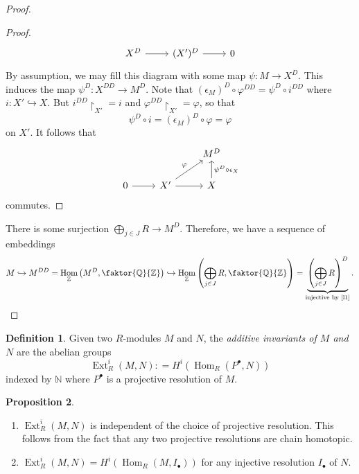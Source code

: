 \documentclass[10pt,letterpaper,cm]{nupset}
\theoremstyle{definition}
\newtheorem{definition}{Definition}[subsection]
\theoremstyle{theorem}
\newtheorem{prop}[definition]{Proposition}
\theoremstyle{remark}
\newcommand{\N}{\mathbb N}
\newcommand{\Q}{\mathbb Q}
\newcommand{\Z}{\mathbb Z}
\newcommand{\1}{\mathbf{1}}
\newcommand{\0}{\vec 0}
\DeclareMathOperator{\ext}{Ext}
\DeclareMathOperator{\Hom}{Hom}
\begin{document}
\begin{proof}
\begin{proof}
\[\begin{tikzcd}
X^D \arrow[r] & (X')^D \arrow[r] & 0
\end{tikzcd}
\]
By assumption, we may fill this diagram with some map $\psi : M \to X^D$. This induces the map $\psi^D : X^{DD} \to M^D$. Note that $(\epsilon_M)^D \circ \varphi^{DD} = \psi^D \circ i^{DD}$ where $i : X' \hookrightarrow X$. But $i^{DD}\restriction_{X'} =i$ and $\varphi^{DD}\restriction_{X'} = \varphi$, so that $$\psi^D \circ i = (\epsilon_M)^D \circ  \varphi = \varphi$$ on $X'$. It follows that
\[
\begin{tikzcd}
 &  & M^D \\
0 \arrow[r] & X' \arrow[r] \arrow[ru, "\varphi"] & X \arrow[u, "\psi^D \circ \epsilon_X"']
\end{tikzcd}
\] commutes.
\end{proof}
There is some surjection $\bigoplus_{j\in J} R \to M^D$. Therefore, we have a sequence of embeddings $$M \hookrightarrow M^{DD} =\Hom_{\Z}\left(M^D, \faktor{\Q}{\Z} \right) \hookrightarrow \Hom_{\Z}\left(\bigoplus_{j\in J} R, \faktor{\Q}{\Z}\right) = \underbrace{\left(\bigoplus_{j\in J} R \right)^D}_{\text{injective by \cref{l1}}}.$$
\end{proof}

\begin{definition}
Given two $R$-modules $M$ and $N$, the \textit{additive invariants of $M$ and $N$} are the abelian groups $$\ext^i_R (M, N): = H^i(\Hom_R(P^{\bullet}, N))$$ indexed by $\N$  where $P^{\bullet}$ is a projective resolution of $M$. 
\end{definition}

\begin{prop}\label{prop2} $ $
\begin{enumerate}
\item $\ext^i_R(M, N)$ is independent of the choice of projective resolution. This follows from the fact that any two projective resolutions are chain homotopic.
\item $\ext^i_R(M, N) = H^i(\Hom_R(M, I_{\bullet}))$ for any injective resolution $I_{\bullet}$ of $N$.
\end{enumerate}
\end{prop}
\end{document}
